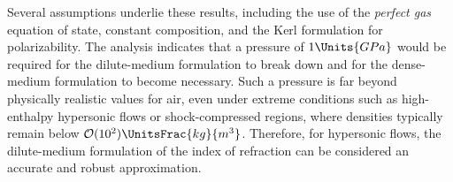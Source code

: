 Several assumptions underlie these results, including the use of the
\textit{perfect gas} equation of state, constant composition, and the Kerl
formulation for polarizability. The analysis indicates that a pressure of
$1\Units{GPa}$ would be required for the dilute-medium formulation to break down and
for the dense-medium formulation to become necessary. Such a pressure is far beyond
physically realistic values for air, even under extreme conditions such as
high-enthalpy hypersonic flows or shock-compressed regions, where densities
typically remain below $\mathcal{O}(10^2)\UnitsFrac{kg}{m^3}$. Therefore, for
hypersonic flows, the dilute-medium formulation of the index of refraction can be
considered an accurate and robust approximation.
